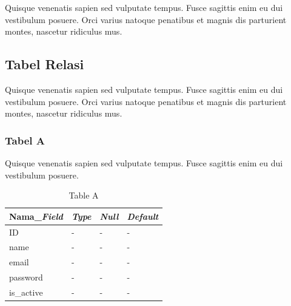 Quisque venenatis sapien sed vulputate tempus. Fusce sagittis enim eu dui vestibulum posuere. Orci varius natoque penatibus et magnis dis parturient montes, nascetur ridiculus mus.

\subsection{Tabel Relasi}
Quisque venenatis sapien sed vulputate tempus. Fusce sagittis enim eu dui vestibulum posuere. Orci varius natoque penatibus et magnis dis parturient montes, nascetur ridiculus mus.

\subsubsection{Tabel A}
Quisque venenatis sapien sed vulputate tempus. Fusce sagittis enim eu dui vestibulum posuere.

\begin{table}[ht!]
    \centering
    \begin{tabular}{|l|l|l|l|}
        \hline
        \textbf{Nama\_\textit{Field}} & \textbf{\textit{Type}} & \textbf{\textit{Null}} & \textbf{\textit{Default}} \\ \hline
        ID                            & -                      & -                      & -                         \\ \hline
        name                          & -                      & -                      & -                         \\ \hline
        email                         & -                      & -                      & -                         \\ \hline
        password                      & -                      & -                      & -                         \\ \hline
        is\_active                    & -                      & -                      & -                         \\ \hline
    \end{tabular}
    \caption{Table A}
    \label{tab:relationTableA}
\end{table}


